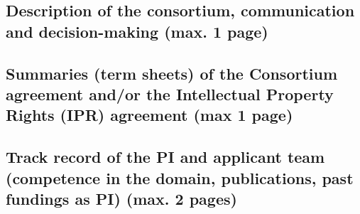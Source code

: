 \subsection{Description of the consortium, communication and decision-making (max. 1 page)}
\subsection{Summaries (term sheets) of the Consortium agreement and/or the Intellectual Property Rights (IPR) agreement (max 1 page)}
\subsection{Track record of the PI and applicant team (competence in the domain, publications, past fundings as PI) (max. 2 pages)}
